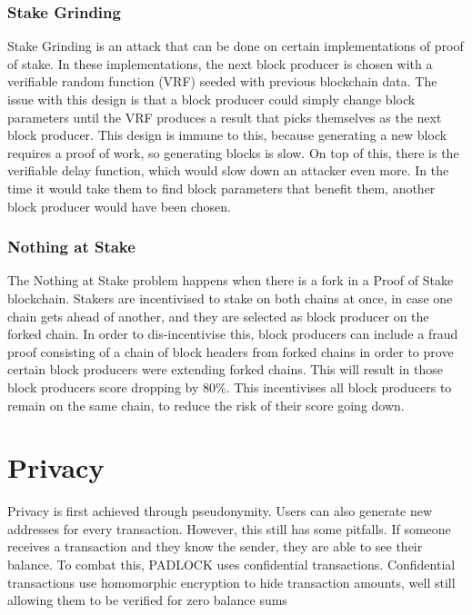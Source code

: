 \documentclass[12pt, letterpaper]{article}
\begin{document}
\subsubsection{Stake Grinding}
Stake Grinding is an attack that can be done on certain implementations of proof
of stake. In these implementations, the next block producer is chosen with a
verifiable random function (VRF) seeded with previous blockchain data. The issue
with this design is that a block producer could simply change block parameters
until the VRF produces a result that picks themselves as the next block
producer. This design is immune to this, because generating a new block requires
a proof of work, so generating blocks is slow. On top of this, there is the
verifiable delay function, which would slow down an attacker even more. In the
time it would take them to find block parameters that benefit them, another
block producer would have been chosen.

\subsubsection{Nothing at Stake}
The Nothing at Stake problem happens when there is a fork in a Proof of Stake
blockchain. Stakers are incentivised to stake on both chains at once, in case
one chain gets ahead of another, and they are selected as block producer on the
forked chain. In order to dis-incentivise this, block producers can include a
fraud proof consisting of a chain of block headers from forked chains in order
to prove certain block producers were extending forked chains. This will result
in those block producers score dropping by 80\%. This incentivises all block
producers to remain on the same chain, to reduce the risk of their score going
down.

\section{Privacy}
Privacy is first achieved through pseudonymity. Users can also generate new
addresses for every transaction. However, this still has some pitfalls. If
someone receives a transaction and they know the sender, they are able to see
their balance. To combat this, PADLOCK uses confidential transactions.
Confidential transactions use homomorphic encryption to hide transaction
amounts, well still allowing them to be verified for zero balance sums
\cite{CT}
\end{document}
